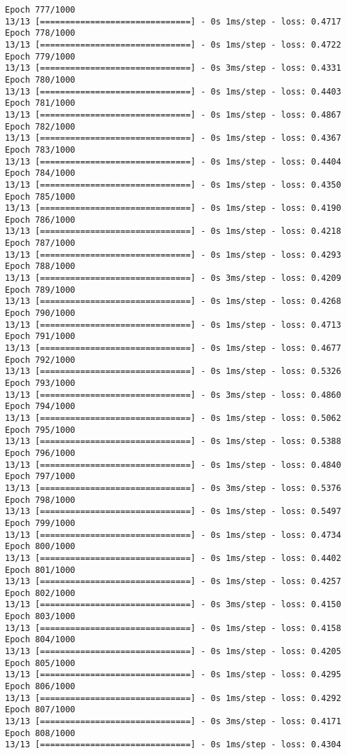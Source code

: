 \documentclass[11pt]{article}
\begin{document}
\begin{Verbatim}[commandchars=\\\{\}]
Epoch 777/1000
13/13 [==============================] - 0s 1ms/step - loss: 0.4717
Epoch 778/1000
13/13 [==============================] - 0s 1ms/step - loss: 0.4722
Epoch 779/1000
13/13 [==============================] - 0s 3ms/step - loss: 0.4331
Epoch 780/1000
13/13 [==============================] - 0s 1ms/step - loss: 0.4403
Epoch 781/1000
13/13 [==============================] - 0s 1ms/step - loss: 0.4867
Epoch 782/1000
13/13 [==============================] - 0s 1ms/step - loss: 0.4367
Epoch 783/1000
13/13 [==============================] - 0s 1ms/step - loss: 0.4404
Epoch 784/1000
13/13 [==============================] - 0s 1ms/step - loss: 0.4350
Epoch 785/1000
13/13 [==============================] - 0s 1ms/step - loss: 0.4190
Epoch 786/1000
13/13 [==============================] - 0s 1ms/step - loss: 0.4218
Epoch 787/1000
13/13 [==============================] - 0s 1ms/step - loss: 0.4293
Epoch 788/1000
13/13 [==============================] - 0s 3ms/step - loss: 0.4209
Epoch 789/1000
13/13 [==============================] - 0s 1ms/step - loss: 0.4268
Epoch 790/1000
13/13 [==============================] - 0s 1ms/step - loss: 0.4713
Epoch 791/1000
13/13 [==============================] - 0s 1ms/step - loss: 0.4677
Epoch 792/1000
13/13 [==============================] - 0s 1ms/step - loss: 0.5326
Epoch 793/1000
13/13 [==============================] - 0s 3ms/step - loss: 0.4860
Epoch 794/1000
13/13 [==============================] - 0s 1ms/step - loss: 0.5062
Epoch 795/1000
13/13 [==============================] - 0s 1ms/step - loss: 0.5388
Epoch 796/1000
13/13 [==============================] - 0s 1ms/step - loss: 0.4840
Epoch 797/1000
13/13 [==============================] - 0s 3ms/step - loss: 0.5376
Epoch 798/1000
13/13 [==============================] - 0s 1ms/step - loss: 0.5497
Epoch 799/1000
13/13 [==============================] - 0s 1ms/step - loss: 0.4734
Epoch 800/1000
13/13 [==============================] - 0s 1ms/step - loss: 0.4402
Epoch 801/1000
13/13 [==============================] - 0s 1ms/step - loss: 0.4257
Epoch 802/1000
13/13 [==============================] - 0s 3ms/step - loss: 0.4150
Epoch 803/1000
13/13 [==============================] - 0s 1ms/step - loss: 0.4158
Epoch 804/1000
13/13 [==============================] - 0s 1ms/step - loss: 0.4205
Epoch 805/1000
13/13 [==============================] - 0s 1ms/step - loss: 0.4295
Epoch 806/1000
13/13 [==============================] - 0s 1ms/step - loss: 0.4292
Epoch 807/1000
13/13 [==============================] - 0s 3ms/step - loss: 0.4171
Epoch 808/1000
13/13 [==============================] - 0s 1ms/step - loss: 0.4304

\end{Verbatim}
\end{document}
